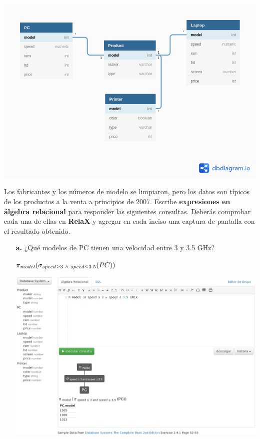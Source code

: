 \documentclass[12pt, letterpaper]{article}
\begin{document}
\begin{itemize}
                    \includegraphics[scale=0.5]{HP.png}
        
                    Los fabricantes y los números de modelo se limpiaron, 
                    pero los datos son típicos de los productos a la venta a 
                    principios de 2007. Escribe \textbf{expresiones en álgebra 
                    relacional} para responder las siguientes consultas. Deberás
                    comprobar cada una de ellas en \textbf{RelaX} y agregar en 
                    cada inciso una captura de pantalla con el resultado obtenido.

                    \newpage

            \begin{itemize}

                \item[\textbf{a.}]  ¿Qué modelos de PC tienen una velocidad entre
                                    3 y 3.5 GHz? 

                                    \begin{center}
                                        $\pi_{model}(\sigma_{speed \geq 3 \hspace{.1cm} \land \hspace{.1cm} speed \leq 3.5} (PC))$\vspace{.3cm}

                                        \includegraphics[scale=0.3]{a.png}
                                    \end{center}



\end{itemize}
\end{itemize}
\end{document}
